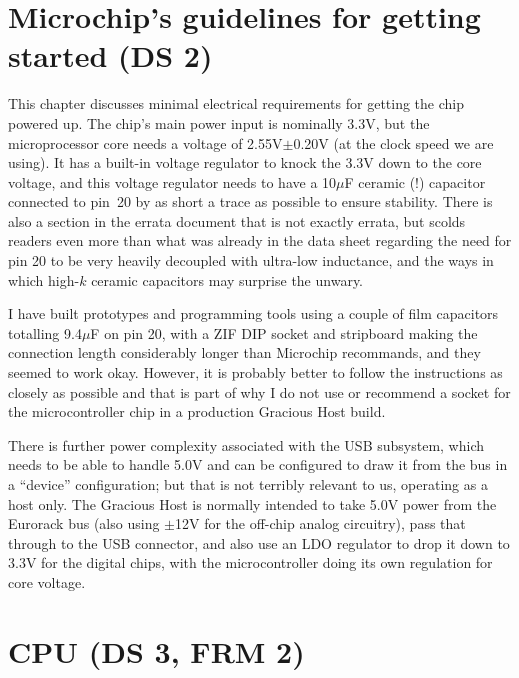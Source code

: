 
\section{Microchip's guidelines for getting started (DS 2)}

This chapter discusses minimal electrical requirements for getting the chip
powered up.  The chip's main power input is nominally 3.3V, but the
microprocessor core needs a voltage of 2.55V$\pm$0.20V (at the clock speed
we are using).  It has a built-in voltage regulator to knock the 3.3V down
to the core voltage, and this voltage regulator needs to have a 10$\mu$F
ceramic (!) capacitor connected to pin~20 by as short a trace as possible to
ensure stability.  There is also a section in the errata document that is
not exactly errata, but scolds readers even more than what was already in
the data sheet regarding the need for pin 20 to be very heavily decoupled
with ultra-low inductance, and the ways in which high-$k$ ceramic capacitors
may surprise the unwary.

I have built prototypes and programming tools using a couple of film
capacitors totalling 9.4$\mu$F on pin 20, with a ZIF DIP socket and
stripboard making the connection length considerably longer than Microchip
recommands, and they seemed to work okay.  However, it is probably better to
follow the instructions as closely as possible and that is part of why I do
not use or recommend a socket for the microcontroller chip in a production
Gracious Host build.

There is further power complexity associated with the USB subsystem, which
needs to be able to handle 5.0V and can be configured to draw it from the
bus in a ``device'' configuration; but that is not terribly relevant to us,
operating as a host only.  The Gracious Host is normally intended to take
5.0V power from the Eurorack bus (also using $\pm$12V for the off-chip
analog circuitry), pass that through to the USB connector, and also use an
LDO regulator to drop it down to 3.3V for the digital chips, with the
microcontroller doing its own regulation for core voltage.


\section{CPU (DS 3, FRM 2)}

